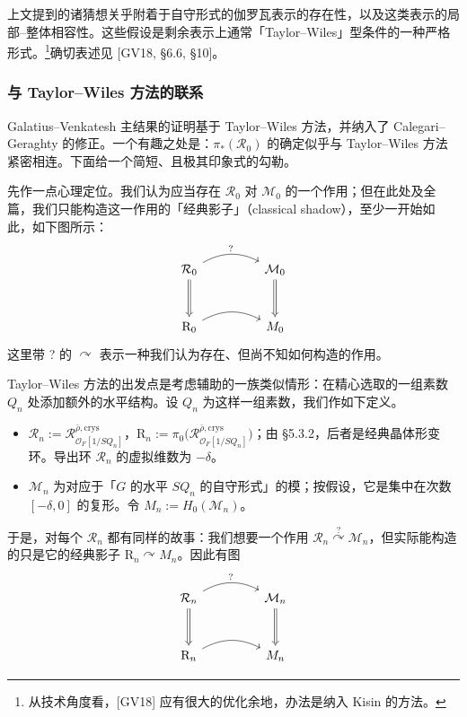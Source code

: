 

上文提到的诸猜想关乎附着于自守形式的伽罗瓦表示的存在性，以及这类表示的局部–整体相容性。这些假设是剩余表示上通常「Taylor–Wiles」型条件的一种严格形式。\footnote{从技术角度看，[GV18] 应有很大的优化余地，办法是纳入 Kisin 的方法。}确切表述见 [GV18, §6.6, §10]。

\subsubsection{与 Taylor–Wiles 方法的联系}

Galatius–Venkatesh 主结果的证明基于 Taylor–Wiles 方法，并纳入了 Calegari–Geraghty 的修正。一个有趣之处是：$\pi_*(\mathcal R_0)$ 的确定似乎与 Taylor–Wiles 方法紧密相连。下面给一个简短、且极其印象式的勾勒。

先作一点心理定位。我们认为应当存在 $\mathcal R_0$ 对 $\mathcal M_0$ 的一个作用；但在此处及全篇，我们只能构造这一作用的「经典影子」（classical shadow），至少一开始如此，如下图所示：
\[
\begin{tikzcd}[column sep=4.5em, row sep=3em]
\mathcal R_0 \arrow[r, bend left=28, "?"] \arrow[d, Rightarrow] & \mathcal M_0 \arrow[d, Rightarrow] \\
\mathrm R_0 \arrow[r, bend left=28] & M_0
\end{tikzcd}
\]
这里带 ? 的 $\curvearrowright$ 表示一种我们认为存在、但尚不知如何构造的作用。

Taylor–Wiles 方法的出发点是考虑辅助的一族类似情形：在精心选取的一组素数 $Q_n$ 处添加额外的水平结构。设 $Q_n$ 为这样一组素数，我们作如下定义。
\begin{itemize}[leftmargin=2em]
\item $\mathcal R_n := \mathcal R^{\bar\rho,\mathrm{crys}}_{\mathcal O_F[1/SQ_n]}$，$\mathrm R_n := \pi_0\bigl(\mathcal R^{\bar\rho,\mathrm{crys}}_{\mathcal O_F[1/SQ_n]}\bigr)$；由 §5.3.2，后者是经典晶体形变环。导出环 $\mathcal R_n$ 的虚拟维数为 $-\delta$。
\item $\mathcal M_n$ 为对应于「$G$ 的水平 $SQ_n$ 的自守形式」的模；按假设，它是集中在次数 $[-\delta,0]$ 的复形。令 $M_n := H_0(\mathcal M_n)$。
\end{itemize}

于是，对每个 $\mathcal R_n$ 都有同样的故事：我们想要一个作用 $\mathcal R_n\overset{?}{\curvearrowright}\mathcal M_n$，但实际能构造的只是它的经典影子 $\mathrm R_n\curvearrowright M_n$。因此有图
\[
\begin{tikzcd}[column sep=4.5em, row sep=3em]
\mathcal R_n \arrow[r, bend left=28, "?"] \arrow[d, Rightarrow] & \mathcal M_n \arrow[d, Rightarrow] \\
\mathrm R_n \arrow[r, bend left=28] & M_n
\end{tikzcd}
\]

